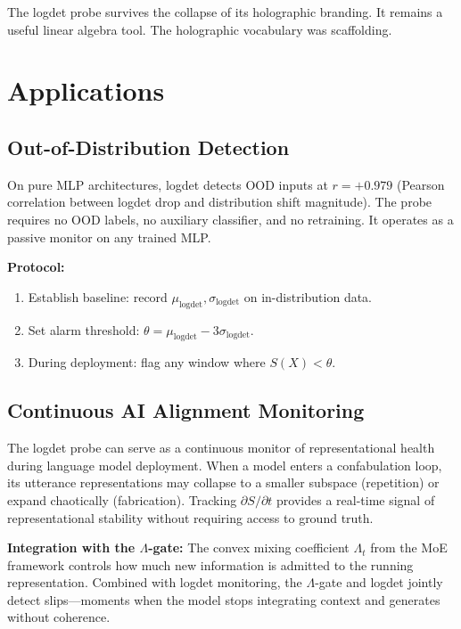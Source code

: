 \documentclass[12pt,a4paper]{article}
\begin{document}
The logdet probe survives the collapse of its holographic branding. It remains a useful linear algebra tool. The holographic vocabulary was scaffolding.

\section{Applications}
\label{sec:applications}

\subsection{Out-of-Distribution Detection}

On pure MLP architectures, logdet detects OOD inputs at $r = +0.979$ (Pearson correlation between logdet drop and distribution shift magnitude). The probe requires no OOD labels, no auxiliary classifier, and no retraining. It operates as a passive monitor on any trained MLP.

\textbf{Protocol:}
\begin{enumerate}
    \item Establish baseline: record $\mu_\text{logdet}, \sigma_\text{logdet}$ on in-distribution data.
    \item Set alarm threshold: $\theta = \mu_\text{logdet} - 3\sigma_\text{logdet}$.
    \item During deployment: flag any window where $S(X) < \theta$.
\end{enumerate}

\subsection{Continuous AI Alignment Monitoring}

The logdet probe can serve as a continuous monitor of representational health during language model deployment. When a model enters a confabulation loop, its utterance representations may collapse to a smaller subspace (repetition) or expand chaotically (fabrication). Tracking $\partial S/\partial t$ provides a real-time signal of representational stability without requiring access to ground truth.

\textbf{Integration with the $\Lambda$-gate:} The convex mixing coefficient $\Lambda_t$ from the MoE framework controls how much new information is admitted to the running representation. Combined with logdet monitoring, the $\Lambda$-gate and logdet jointly detect slips---moments when the model stops integrating context and generates without coherence.
\end{document}
